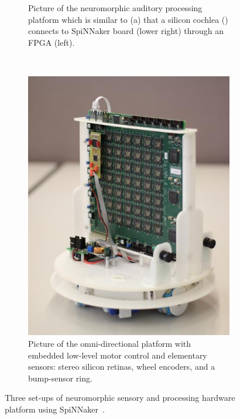 \begin{figure}[tbp!]
\begin{subfigure}[t]{0.528\textwidth}
		\caption{Picture of the neuromorphic auditory processing platform which is similar to (a) \DIFaddbeginFL {}\DIFaddendFL that a silicon cochlea (\DIFdelbeginFL {}\DIFdelendFL \DIFaddbeginFL {}\DIFaddendFL ) connects to \DIFaddbeginFL {}\DIFaddendFL SpiNNaker board (lower right) through an FPGA (left).}
	\end{subfigure}
	~~
	\begin{subfigure}[t]{0.4\textwidth}
		\includegraphics[width=\textwidth]{pics_snn/omnibot.jpg}
		\caption{Picture of the omni-directional platform with embedded low-level motor control and elementary sensors: stereo silicon retinas, wheel encoders, and a bump-sensor ring.}
	\end{subfigure}
	\caption{Three set-ups of neuromorphic sensory and processing hardware platform using SpiNNaker~\DIFdelbeginFL {}\DIFdelendFL \DIFaddbeginFL {}\DIFaddendFL .}
	\label{Fig:close-loop}
\end{figure}

